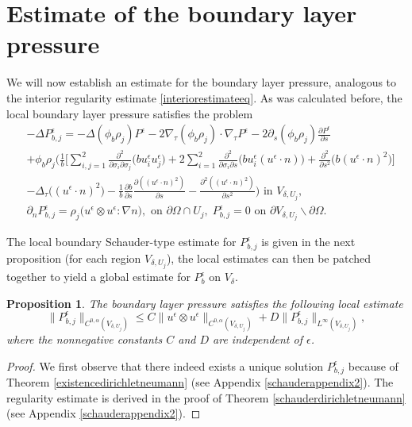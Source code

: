 \documentclass[12pt,a4paper]{article}
\newtheorem{proposition}[theorem]{Proposition}
\theoremstyle{definition}
\theoremstyle{remark}
\numberwithin{equation}{section}
\begin{document}
\section{Estimate of the boundary layer pressure} \label{decompositionsection}
We will now establish an estimate for the boundary layer pressure, analogous to the interior regularity estimate \eqref{interiorestimateeq}. As was calculated before, the local boundary layer pressure satisfies the problem
\begingroup
\allowdisplaybreaks
\begin{align*}
&-\Delta P^\epsilon_{b,j}  = - \Delta (\phi_b \rho_j) P^\epsilon - 2 \nabla_\tau (\phi_b \rho_j) \cdot \nabla_\tau P^\epsilon - 2 \partial_s (\phi_b \rho_j) \frac{\partial P^\epsilon}{\partial s} \nonumber \\
&+ \phi_b \rho_j \bigg( \frac{1}{b} \bigg[ \sum_{i,j=1}^2 \frac{\partial^2}{\partial \sigma_i \partial \sigma_j} \big( b u^\epsilon_i u^\epsilon_j \big) + 2 \sum_{i=1}^2 \frac{\partial^2}{\partial \sigma_i \partial s} \big( b u^\epsilon_i (u^\epsilon \cdot n) \big) + \frac{\partial^2}{\partial s^2} \big( b (u^\epsilon \cdot n)^2 \big) \bigg] \nonumber \\
&- \Delta_\tau \big( (u^\epsilon \cdot n)^2 \big) - \frac{1}{b} \frac{\partial b}{\partial s} \frac{\partial ((u^\epsilon \cdot n)^2)}{\partial s} - \frac{\partial^2 ((u^\epsilon \cdot n)^2)}{\partial s^2} \bigg) \text{ in } V_{\delta, U_j}, \\
&\partial_n P^{\epsilon}_{b,j} = \rho_j \big( u^\epsilon \otimes u^\epsilon : \nabla n \big), \text{ on } \partial \Omega \cap U_j, \; P^{\epsilon}_{b,j} = 0 \text{ on } \partial V_{\delta, U_j} \backslash \partial \Omega.
\end{align*}
\endgroup

The local boundary Schauder-type estimate for $P^{\epsilon}_{b,j}$ is given in the next proposition (for each region $V_{\delta,U_j}$), the local estimates can then be patched together to yield a global estimate for $P^{\epsilon}_{b}$ on $V_\delta$.
\begin{proposition} \label{boundaryestimates}
The boundary layer pressure satisfies the following local estimate
\begin{equation*}
\lVert P^{\epsilon}_{b,j} \rVert_{C^{0, \alpha} (V_{\delta,U_j}) } \leq C \lVert u^\epsilon \otimes u^\epsilon \rVert_{C^{0, \alpha} (V_{\delta,U_j})} + D \lVert P^{\epsilon}_{b,j} \rVert_{L^\infty (V_{\delta,U_j})},
\end{equation*}
where the nonnegative constants $C$ and $D$ are independent of $\epsilon$.
\end{proposition}
\begin{proof}
We first observe that there indeed exists a unique solution $P^{\epsilon}_{b,j}$ because of Theorem \ref{existencedirichletneumann} (see Appendix \ref{schauderappendix2}). The regularity estimate is derived in the proof of Theorem \ref{schauderdirichletneumann} (see Appendix \ref{schauderappendix2}).
\end{proof}
\end{document}
